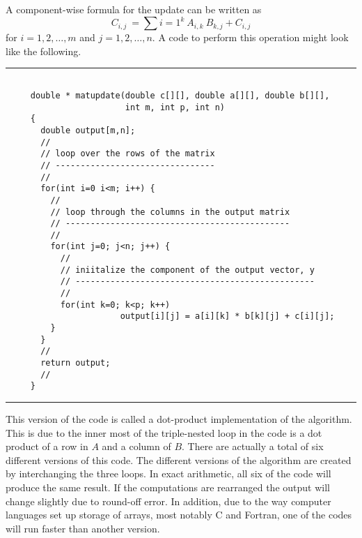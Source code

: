 \documentclass[10pt,fleqn]{article}
\begin{document}
A component-wise formula for the update can be written as
$$
  C_{i,j}\ = \sum{i=1}^k\ A_{i,k}\ B_{k,j} + C_{i,j}
$$
for $i=1,2,\ldots,m$ and $j=1,2,\ldots, n$. A code to perform this operation
might look like the following.
\vskip0.1in\hrule\vskip0.1in
\begin{verbatim}

     double * matupdate(double c[][], double a[][], double b[][],
                        int m, int p, int n)
     {
       double output[m,n];
       //
       // loop over the rows of the matrix
       // --------------------------------
       //
       for(int i=0 i<m; i++) {
         //
         // loop through the columns in the output matrix
         // ---------------------------------------------
         //
         for(int j=0; j<n; j++) {
           //
           // iniitalize the component of the output vector, y
           // ------------------------------------------------
           //
           for(int k=0; k<p; k++)
                       output[i][j] = a[i][k] * b[k][j] + c[i][j];
         }
       }
       //
       return output;
       //
     }

\end{verbatim}
\vskip0.1in\hrule\vskip0.1in
This version of the code is called a dot-product implementation of the
algorithm. This is due to the inner most of the triple-nested loop in the code
is a dot product of a row in $A$ and a column of $B$. There are actually a total
of six  different versions of this code. The different versions of the algorithm
are created by interchanging the three loops. In exact arithmetic, all six of
the code will produce the same result. If the computations are rearranged the
output will change slightly due to round-off error. In addition, due to the way
computer languages set up storage of arrays, most notably C and Fortran, one of
the codes will run faster than another version.
\end{document}
